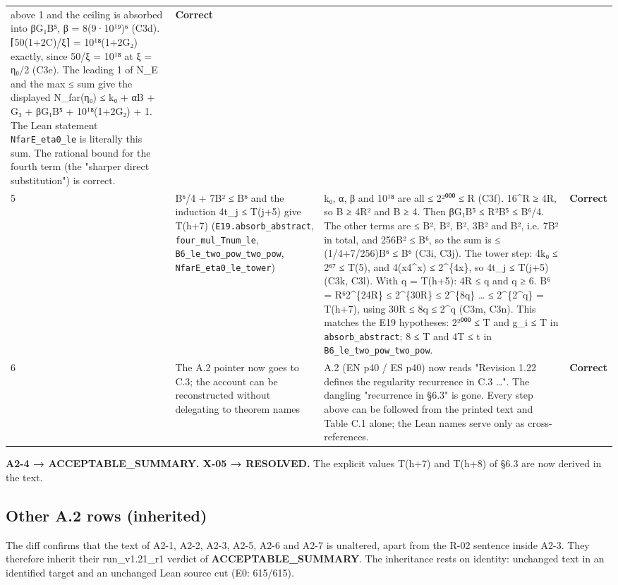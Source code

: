 \documentclass[
]{article}
\begin{document}
{\begin{longtable}[]{@{}llll@{}}
above 1 and the ceiling is absorbed into βG₁B⁵, β = 8(9·10¹⁹)⁶ (C3d).
⌈50(1+2C)/ξ⌉ = 10¹⁸(1+2G₂) exactly, since 50/ξ = 10¹⁸ at ξ = η₀/2 (C3e).
The leading 1 of N\_E and the max ≤ sum give the displayed N\_far(η₀) ≤
k₀ + αB + G₃ + βG₁B⁵ + 10¹⁸(1+2G₂) + 1. The Lean statement
\texttt{NfarE\_eta0\_le} is literally this sum. The rational bound for
the fourth term (the "sharper direct substitution") is correct. &
\textbf{Correct} \\
5 & B⁶/4 + 7B² ≤ B⁶ and the induction 4t\_j ≤ T(j+5) give T(h+7)
(\texttt{E19.absorb\_abstract}, \texttt{four\_mul\_Tnum\_le},
\texttt{B6\_le\_two\_pow\_two\_pow}, \texttt{NfarE\_eta0\_le\_tower}) &
k₀, α, β and 10¹⁸ are all ≤ 2²⁰⁰⁰ ≤ R (C3f). 16\^{}R ≥ 4R, so B ≥ 4R²
and B ≥ 4. Then βG₁B⁵ ≤ R²B⁵ ≤ B⁶/4. The other terms are ≤ B², B², B²,
3B² and B², i.e. 7B² in total, and 256B² ≤ B⁶, so the sum is ≤
(1/4+7/256)B⁶ ≤ B⁶ (C3i, C3j). The tower step: 4k₀ ≤ 2⁶⁷ ≤ T(5), and
4(x4\^{}x) ≤ 2\^{}\{4x\}, so 4t\_j ≤ T(j+5) (C3k, C3l). With q = T(h+5):
4R ≤ q and q ≥ 6. B⁶ = R⁶2\^{}\{24R\} ≤ 2\^{}\{30R\} ≤ 2\^{}\{8q\}
\ldots{} ≤ 2\^{}\{2\^{}q\} = T(h+7), using 30R ≤ 8q ≤ 2\^{}q (C3m, C3n).
This matches the E19 hypotheses: 2²⁰⁰⁰ ≤ T and g\_i ≤ T in
\texttt{absorb\_abstract}; 8 ≤ T and 4T ≤ t in
\texttt{B6\_le\_two\_pow\_two\_pow}. & \textbf{Correct} \\
6 & The A.2 pointer now goes to C.3; the account can be reconstructed
without delegating to theorem names & A.2 (EN p40 / ES p40) now reads
"Revision 1.22 defines the regularity recurrence in C.3 \ldots". The
dangling "recurrence in §6.3" is gone. Every step above can be followed
from the printed text and Table C.1 alone; the Lean names serve only as
cross-references. & \textbf{Correct} \\
\end{longtable}
}

\textbf{A2-4 → ACCEPTABLE\_SUMMARY. X-05 → RESOLVED.} The explicit
values T(h+7) and T(h+8) of §6.3 are now derived in the text.

\subsection{Other A.2 rows (inherited)}\label{other-a2-rows-inherited}

The diff confirms that the text of A2-1, A2-2, A2-3, A2-5, A2-6 and A2-7
is unaltered, apart from the R-02 sentence inside A2-3. They therefore
inherit their run\_v1.21\_r1 verdict of \textbf{ACCEPTABLE\_SUMMARY}.
The inheritance rests on identity: unchanged text in an identified
target and an unchanged Lean source cut (E0: 615/615).
\end{document}
